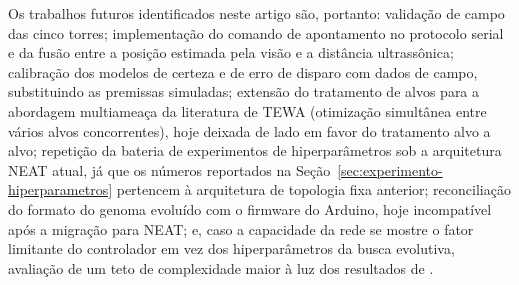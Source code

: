\documentclass[12pt,a4paper]{article}
\begin{document}
Os trabalhos futuros identificados neste artigo são, portanto: validação de campo das cinco
torres; implementação do comando de apontamento no protocolo serial e da fusão
entre a posição estimada pela visão e a distância ultrassônica; calibração dos modelos de certeza e
de erro de disparo com dados de campo, substituindo as premissas simuladas; extensão do tratamento
de alvos para a abordagem multiameaça da literatura de TEWA (otimização simultânea entre vários
alvos concorrentes), hoje deixada de lado em favor do tratamento alvo a alvo; repetição da bateria
de experimentos de hiperparâmetros sob a arquitetura NEAT atual, já que os números reportados na
Seção~\ref{sec:experimento-hiperparametros} pertencem à arquitetura de topologia fixa anterior;
reconciliação do formato do genoma evoluído com o firmware do Arduino, hoje incompatível após a
migração para NEAT; e, caso a capacidade da rede se mostre o fator limitante do controlador em vez
dos hiperparâmetros da busca evolutiva, avaliação de um teto de complexidade maior à luz dos
resultados de .


\end{document}
